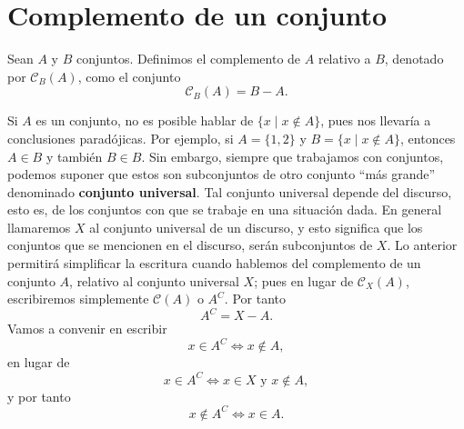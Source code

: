 \newpage

\section{Complemento de un conjunto}

\begin{definicion}{}{}
    Sean $A$ y $B$ conjuntos. Definimos el complemento de $A$ relativo a $B$, denotado por $\mathcal{C}_B(A)$, como el conjunto
    $$\mathcal{C}_B(A) = B - A.$$
\end{definicion}

Si $A$ es un conjunto, no es posible hablar de $\{x \mid x \notin A\}$, pues nos llevaría a conclusiones paradójicas. Por ejemplo, si $A=\{1,  2\}$ y $B=\{x \mid x \notin A\}$, entonces $A \in B$ y también $B \in B$. Sin embargo, siempre que trabajamos con conjuntos, podemos suponer que estos son subconjuntos de otro conjunto ``más grande'' denominado \textbf{conjunto universal}. Tal conjunto universal depende del discurso, esto es, de los conjuntos con que se trabaje en una situación dada. En general llamaremos $X$ al conjunto universal de un discurso, y esto significa que los conjuntos que se mencionen en el discurso, serán subconjuntos de $X$. Lo anterior permitirá simplificar la escritura cuando hablemos del complemento de un conjunto $A$, relativo al conjunto universal $X$; pues en lugar de $\mathcal{C}_X(A)$, escribiremos simplemente $\mathcal{C}(A)$ o $A^C$. Por tanto
$$A^C = X - A.$$
Vamos a convenir en escribir
$$x \in A^C \Longleftrightarrow x \notin A,$$
en lugar de
$$x \in A^C \Longleftrightarrow x \in X \text{ y } x \notin A,$$
y por tanto
$$x \notin A^C \Longleftrightarrow x \in A.$$

